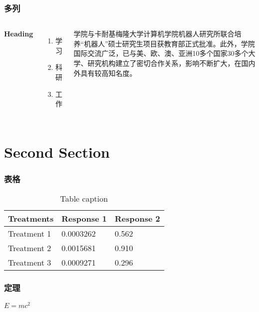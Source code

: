 
\begin{frame}
\frametitle{多列}
\begin{columns}[c] %

\textbf{Heading}
\begin{enumerate}
\item 学习
\item 科研
\item 工作
\end{enumerate}

学院与卡耐基梅隆大学计算机学院机器人研究所联合培养“机器人”硕士研究生项目获教育部正式批准。此外，学院国际交流广泛，已与美、欧、澳、亚洲10多个国家30多个大学、研究机构建立了密切合作关系，影响不断扩大，在国内外具有较高知名度。

\end{columns}
\end{frame}

\section{Second Section}

\begin{frame}
\frametitle{表格}
\begin{table}
\begin{tabular}{l l l}
\toprule
\textbf{Treatments} & \textbf{Response 1} & \textbf{Response 2}\\
\midrule
Treatment 1 & 0.0003262 & 0.562 \\
Treatment 2 & 0.0015681 & 0.910 \\
Treatment 3 & 0.0009271 & 0.296 \\
\bottomrule
\end{tabular}
\caption{Table caption}
\end{table}
\end{frame}


\begin{frame}
\frametitle{定理}
\begin{theorem}
$E = mc^2$
\end{theorem}
\end{frame}

